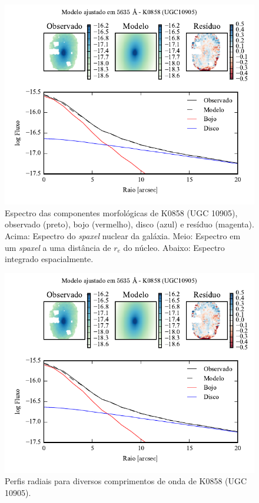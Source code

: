 \begin{figure}
	\includegraphics[page=4]{figuras-decomp/K0858_sample006a}
	\caption[Espectro das componentes morfológicas de K0858 (UGC 10905)]
	{Espectro das componentes morfológicas de K0858 (UGC 10905),
	observado (preto), bojo (vermelho), disco (azul) e resíduo (magenta). Acima:
	Espectro do {\em spaxel} nuclear da galáxia. Meio: Espectro em um {\em spaxel}
	a uma distância de $r_e$ do núcleo. Abaixo: Espectro integrado espacialmente.}
	\label{fig:decompSpectra:K0858}
\end{figure}

\begin{figure}
	\includegraphics[page=5]{figuras-decomp/K0858_sample006a}
	\caption[Perfis radiais para diversos comprimentos de onda de K0858 (UGC 10905)]
	{Perfis radiais para diversos comprimentos de onda de K0858 (UGC 10905).}
	\label{fig:decompRadprofSpec:K0858}
\end{figure}

